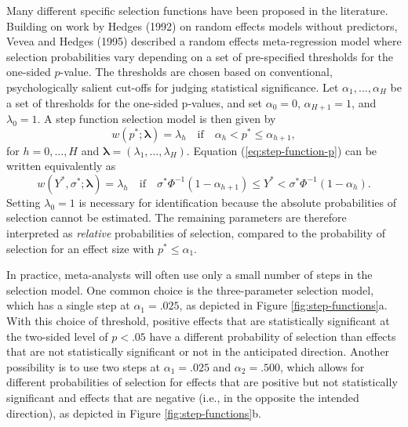 \documentclass[
  man, donotrepeattitle,floatsintext]{apa7}
\begin{document}
Many different specific selection functions have been proposed in the literature.
Building on work by Hedges (1992) on random effects models without predictors, Vevea and Hedges (1995) described a random effects meta-regression model where selection probabilities vary depending on a set of pre-specified thresholds for the one-sided \(p\)-value.
The thresholds are chosen based on conventional, psychologically salient cut-offs for judging statistical significance.
Let \(\alpha_1,...,\alpha_H\) be a set of thresholds for the one-sided p-values, and set \(\alpha_0 = 0\), \(\alpha_{H+1} = 1\), and \(\lambda_0 = 1\).
A step function selection model is then given by
\begin{equation}
\label{eq:step-function-p}
w(p^*; \boldsymbol\lambda) =  \lambda_h \quad \text{if} \quad \alpha_{h} < p^* \leq \alpha_{h+1}, 
\end{equation}
for \(h = 0,...,H\) and \(\boldsymbol\lambda = \left(\lambda_1,...,\lambda_H\right)\).
Equation (\ref{eq:step-function-p}) can be written equivalently as
\begin{equation}
\label{eq:step-function-y}
w(Y^*, \sigma^*; \boldsymbol\lambda) =  \lambda_h \quad \text{if} \quad \sigma^* \Phi^{-1}\left(1 - \alpha_{h+1}\right) \leq Y^*  < \sigma^* \Phi^{-1}\left(1 - \alpha_h\right). 
\end{equation}
Setting \(\lambda_0 = 1\) is necessary for identification because the absolute probabilities of selection cannot be estimated.
The remaining parameters are therefore interpreted as \emph{relative} probabilities of selection, compared to the probability of selection for an effect size with \(p^* \leq \alpha_1\).

In practice, meta-analysts will often use only a small number of steps in the selection model.
One common choice is the three-parameter selection model, which has a single step at \(\alpha_1 = .025\), as depicted in Figure \ref{fig:step-functions}a.
With this choice of threshold, positive effects that are statistically significant at the two-sided level of \(p < .05\) have a different probability of selection than effects that are not statistically significant or not in the anticipated direction.
Another possibility is to use two steps at \(\alpha_1 = .025\) and \(\alpha_2 = .500\), which allows for different probabilities of selection for effects that are positive but not statistically significant and effects that are negative (i.e., in the opposite the intended direction), as depicted in Figure \ref{fig:step-functions}b.
\end{document}
